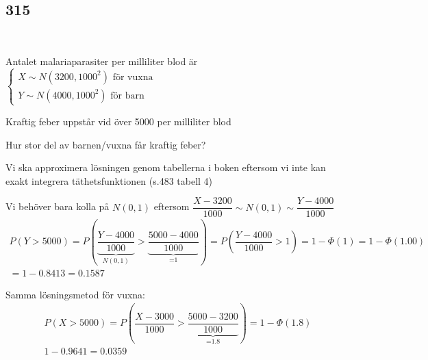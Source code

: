 \subsection{315}\hfill\\\par
\noindent Antalet malariaparasiter per milliliter blod är $\begin{cases}X\sim N(3200,1000^2)\text{ för vuxna}\\Y\sim N(4000,1000^2)\text{ för barn}\end{cases}$ \par
\noindent Kraftig feber uppstår vid över 5000 per milliliter blod\par
\noindent Hur stor del av barnen/vuxna får kraftig feber?
\par\bigskip
\noindent Vi ska approximera lösningen genom tabellerna i boken eftersom vi inte kan exakt integrera täthetsfunktionen (s.483 tabell 4)
\par\bigskip
\noindent Vi behöver bara kolla på $N(0,1)$ eftersom $\dfrac{X-3200}{1000}\sim N(0,1)\sim \dfrac{Y-4000}{1000}$
\begin{equation*}
  \begin{gathered}
    P(Y>5000) = P\left(\underbrace{\dfrac{Y-4000}{1000}}_{\text{$N(0,1)$}}>\underbrace{\dfrac{5000-4000}{1000}}_{\text{=1}}\right) = P\left(\dfrac{Y-4000}{1000}>1\right) = 1-\Phi(1) = 1-\Phi(1.00)\\
    = 1-0.8413 = 0.1587
  \end{gathered}
\end{equation*}\par
\noindent Samma lösningsmetod för vuxna:
\begin{equation*}
  \begin{gathered}
    P(X>5000) = P\left(\dfrac{X-3000}{1000}>\underbrace{\dfrac{5000-3200}{1000}}_{\text{=1.8}}\right) = 1-\Phi(1.8)\\
    1-0.9641 = 0.0359
  \end{gathered}
\end{equation*}
\par\bigskip
